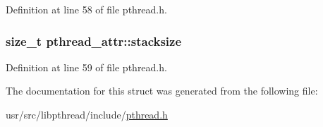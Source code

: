 Definition at line 58 of file pthread.\+h.

\hypertarget{structpthread__attr_a8b8eaabf2bc9b4cec33d7764bbb115d9}{
\subsubsection[{stacksize}]{\setlength{\rightskip}{0pt plus 5cm}size\+\_\+t pthread\+\_\+attr\+::stacksize}}\label{structpthread__attr_a8b8eaabf2bc9b4cec33d7764bbb115d9}


Definition at line 59 of file pthread.\+h.



The documentation for this struct was generated from the following file\+:\begin{DoxyCompactItemize}
\item 
usr/src/libpthread/include/\hyperlink{pthread_8h}{pthread.\+h}\end{DoxyCompactItemize}
